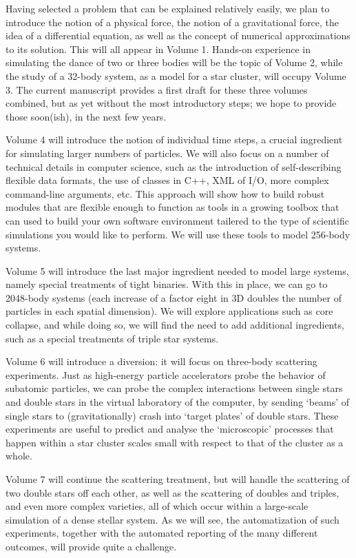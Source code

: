 Having selected a problem that can be explained relatively easily, we
plan to introduce the notion of a physical force, the notion of a
gravitational force, the idea of a differential equation, as well as
the concept of numerical approximations to its solution.  This will
all appear in Volume 1.  Hands-on experience in simulating the dance
of two or three bodies will be the topic of Volume 2, while the study
of a 32-body system, as a model for a star cluster, will occupy Volume
3.  The current manuscript provides a first draft for these three
volumes combined, but as yet without the most introductory steps; we
hope to provide those soon(ish), in the next few years.

Volume 4 will introduce the notion of individual time steps, a crucial
ingredient for simulating larger numbers of particles.  We will also
focus on a number of technical details in computer science, such as
the introduction of self-describing flexible data formats, the use of
classes in C++, XML of I/O, more complex command-line arguments, etc.
This approach will show how to build robust modules that are flexible
enough to function as tools in a growing toolbox that can used to
build your own software environment tailered to the type of scientific
simulations you would like to perform.  We will use these tools to
model 256-body systems.

Volume 5 will introduce the last major ingredient needed to model
large systems, namely special treatments of tight binaries.  With this
in place, we can go to 2048-body systems (each increase of a factor
eight in 3D doubles the number of particles in each spatial dimension).
We will explore applications such as core collapse, and while doing
so, we will find the need to add additional ingredients, such as a
special treatments of triple star systems.

Volume 6 will introduce a diversion: it will focus on three-body
scattering experiments.  Just as high-energy particle accelerators
probe the behavior of subatomic particles, we can probe the complex
interactions between single stars and double stars in the virtual
laboratory of the computer, by sending `beams' of single stars to
(gravitationally) crash into `target plates' of double stars.  These
experiments are useful to predict and analyse the `microscopic'
processes that happen within a star cluster scales small with respect
to that of the cluster as a whole.

Volume 7 will continue the scattering treatment, but will handle the
scattering of two double stars off each other, as well as the
scattering of doubles and triples, and even more complex varieties,
all of which occur within a large-scale simulation of a dense stellar
system.  As we will see, the automatization of such experiments,
together with the automated reporting of the many different outcomes,
will provide quite a challenge.

